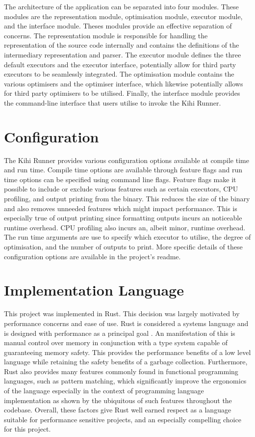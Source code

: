 The architecture of the application can be separated into four modules. These modules are the representation module, optimisation module, executor module, and the interface module. Theses modules provide an effective separation of concerns. The representation module is responsible for handling the representation of the source code internally and contains the definitions of the intermediary representation and parser. The executor module defines the three default executors and the executor interface, potentially allow for third party executors to be seamlessly integrated. The optimisation module contains the various optimisers and the optimiser interface, which likewise potentially allows for third party optimisers to be utilised. Finally, the interface module provides the command-line interface that users utilise to invoke the Kihi Runner.

\section{Configuration}
The Kihi Runner provides various configuration options available at compile time and run time. Compile time options are available through feature flags and run time options can be specified using command line flags. Feature flags make it possible to include or exclude various features such as certain executors, CPU profiling, and output printing from the binary. This reduces the size of the binary and also removes unneeded features which might impact performance. This is especially true of output printing since formatting outputs incurs an noticeable runtime overhead. CPU profiling also incurs an, albeit minor, runtime overhead. The run time arguments are use to specify which executor to utilise, the degree of optimisation, and the number of outputs to print. More specific details of these configuration options are available in the project's readme.

\section{Implementation Language}
This project was implemented in Rust. This decision was largely motivated by performance concerns and ease of use. Rust is considered a systems language and is designed with performance as a principal goal \cite{matsakis2014rust}. An manifestation of this is manual control over memory in conjunction with a type system capable of guaranteeing memory safety. This provides the performance benefits of a low level language while retaining the safety benefits of a garbage collection. Furthermore, Rust also provides many features commonly found in functional programming languages, such as pattern matching, which significantly improve the ergonomics of the language especially in the context of programming language implementation as shown by the ubiquitous of such features throughout the codebase. Overall, these factors give Rust well earned respect as a language suitable for performance sensitive projects, and an especially compelling choice for this project.

